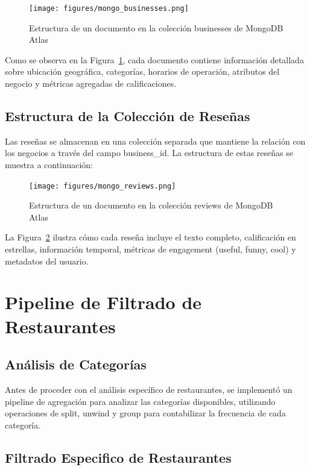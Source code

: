 \documentclass[12pt,a4paper,twoside,openany]{book}
\begin{document}
\begin{figure}[H]
\centering
\texttt{[image: figures/mongo\_businesses.png]}
\caption{Estructura de un documento en la colección businesses de MongoDB Atlas}
\label{fig:mongo_businesses}
\end{figure}

Como se observa en la Figura~\ref{fig:mongo_businesses}, cada documento contiene información detallada sobre ubicación geográfica, categorías, horarios de operación, atributos del negocio y métricas agregadas de calificaciones.

\subsection{Estructura de la Colección de Reseñas}

Las reseñas se almacenan en una colección separada que mantiene la relación con los negocios a través del campo business\_id. La estructura de estas reseñas se muestra a continuación:

\begin{figure}[H]
\centering
\texttt{[image: figures/mongo\_reviews.png]}
\caption{Estructura de un documento en la colección reviews de MongoDB Atlas}
\label{fig:mongo_reviews}
\end{figure}

La Figura~\ref{fig:mongo_reviews} ilustra cómo cada reseña incluye el texto completo, calificación en estrellas, información temporal, métricas de engagement (useful, funny, cool) y metadatos del usuario.

\section{Pipeline de Filtrado de Restaurantes}

\subsection{Análisis de Categorías}

Antes de proceder con el análisis específico de restaurantes, se implementó un pipeline de agregación para analizar las categorías disponibles, utilizando operaciones de split, unwind y group para contabilizar la frecuencia de cada categoría.

\subsection{Filtrado Especifico de Restaurantes}
\end{document}
